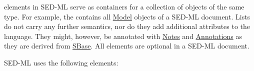 \label{listOfElements}
 elements in SED-ML serve as containers  for a collection of objects of the same type. For example, the  contains all \hyperref[class:model]{Model} objects of a SED-ML document. Lists do not carry any further semantics, nor do they add additional attributes to the language. They might, however, be annotated with \hyperref[class:notes]{Notes} and \hyperref[class:annotation]{Annotations} as they are derived from \hyperref[class:sbase]{SBase}.
All  elements are optional in a SED-ML document. 

SED-ML uses the following  elements:

